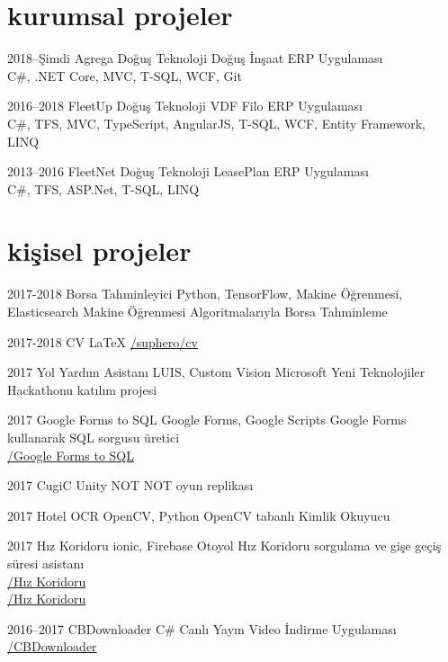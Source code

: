 \documentclass[]{../friggeri-cv} %
\begin{document}
\section{kurumsal projeler}

\begin{entrylist}

\entry
{2018--Şimdi}
{Agrega}
{Doğuş Teknoloji}
{Doğuş İnşaat ERP Uygulaması
\\C\#, .NET Core, MVC, T-SQL, WCF, Git}

\entry
{2016--2018}
{FleetUp}
{Doğuş Teknoloji}
{VDF Filo ERP Uygulaması
\\C\#, TFS, MVC, TypeScript, AngularJS, T-SQL, WCF, Entity Framework, LINQ}

\entry
{2013--2016}
{FleetNet}
{Doğuş Teknoloji}
{LeasePlan ERP Uygulaması
\\C\#, TFS, ASP.Net, T-SQL, LINQ}

\end{entrylist}

\section{kişisel projeler}

\begin{entrylist}

\entry
{2017-2018}
{Borsa Tahminleyici}
{Python, TensorFlow, Makine Öğrenmesi, Elasticsearch}
{Makine Öğrenmesi Algoritmalarıyla Borsa Tahminleme}

\entry
{2017-2018}
{CV}
{\LaTeX}
{\href{https://github.com/suphero/cv}{\faGithub/suphero/cv}}

\entry
{2017}
{Yol Yardım Asistanı}
{LUIS, Custom Vision}
{Microsoft Yeni Teknolojiler Hackathonu katılım projesi}

\entry
{2017}
{Google Forms to SQL}
{Google Forms, Google Scripts}
{Google Forms kullanarak SQL sorgusu üretici
\\\href{https://github.com/suphero/Google-Forms-to-SQL}{\faGithub/Google Forms to SQL}}

\entry
{2017}
{CugiC}
{Unity}
{NOT NOT oyun replikası}

\entry
{2017}
{Hotel OCR}
{OpenCV, Python}
{OpenCV tabanlı Kimlik Okuyucu}

\entry
{2017}
{Hız Koridoru}
{ionic, Firebase}
{Otoyol Hız Koridoru sorgulama ve gişe geçiş süresi asistanı
\\\href{https://play.google.com/store/apps/details?id=com.harunsokullu.speedcorridor}{\faAndroid/Hız Koridoru}
\\\href{https://itunes.apple.com/tr/app/h\%C4\%B1z-koridoru/id1265151812}{\faApple/Hız Koridoru}}

\entry
{2016--2017}
{CBDownloader}
{C\#}
{Canlı Yayın Video İndirme Uygulaması
\\\href{https://github.com/suphero/CBDownloader}{\faGithub/CBDownloader}}

\end{entrylist}
\end{document}
